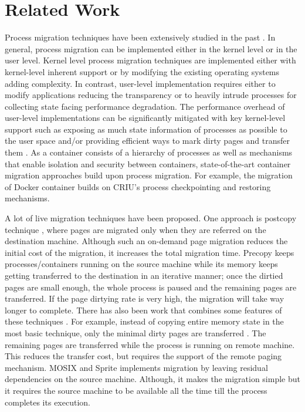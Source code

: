 \section{Related Work}
\label{sec:related}
\vspace{-0.05in}
 Process migration techniques have been extensively studied in the past \cite{spin, exokernel, synthetix, baraks, zayas, douglis, theimer, lsf, condor, criu}. In general, process migration can be implemented either in the kernel level or in the user level. Kernel level process migration techniques \cite{spin, exokernel, synthetix, baraks, zayas, douglis, theimer} are implemented either with kernel-level inherent support or by modifying the existing operating systems adding complexity. In contrast, user-level implementation \cite{lsf, condor, criu, Amoeba, Chorus, Mach} requires either to modify applications reducing the transparency or to heavily intrude processes for collecting state facing performance degradation. The performance overhead of user-level implementations can be significantly mitigated with key kernel-level support such as exposing as much state information of processes as possible to the user space and/or providing efficient ways to mark dirty pages and transfer them \cite{condor, lsf, criu}. As a container consists of a hierarchy of processes as well as mechanisms that enable isolation and security between containers, state-of-the-art container migration approaches  \cite{docker, openvz, coreos_rocket} build upon process migration. For example, the migration of Docker container \cite{docker} builds on CRIU's \cite{criu} process checkpointing and restoring mechanisms. 

 A lot of live migration techniques have been proposed.  One approach is postcopy technique \cite{Hines:2009:PLM:1618525.1618528, zayas}, where pages are migrated only when they are referred on the destination machine. Although such an on-demand page migration reduces the initial cost of the migration, it increases the total migration time. Precopy \cite{theimer} keeps processes/containers running on the source machine while its memory keeps getting transferred to the destination in an iterative manner; once the dirtied pages are small enough, the whole process is paused and the remaining pages are transferred. If the page dirtying rate is very high, the migration will take way longer to complete. There has also been work that combines some features of these techniques \cite{lazo, loubutin, sinha, dediu, dijk,schill,petri,schrimpf} . For example, instead of copying entire memory state in the most basic technique, only the minimal dirty pages are transferred \cite{roush}. The remaining pages are transferred while the process is running on remote machine. This reduces the transfer cost, but requires the support of the remote paging mechanism. MOSIX \cite{mosix} and Sprite \cite{sprite} implements migration by leaving residual dependencies on the source machine. Although, it makes the migration simple but it requires the source machine to be available all the time till the process completes its execution. 
